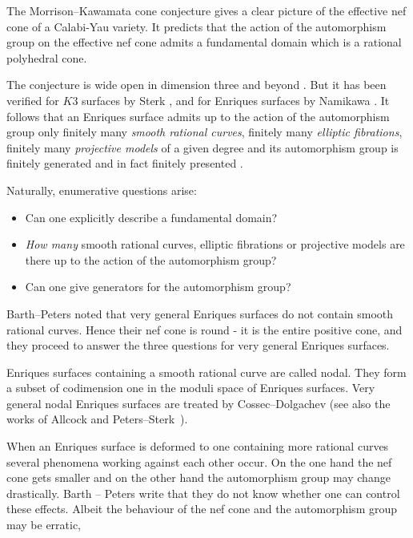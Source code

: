 \documentclass{amsart}
\numberwithin{procedure}{section}
\begin{document}
The Morrison--Kawamata cone conjecture \cite{morrison1992,kawamata1997} gives a clear picture of the effective nef cone of a Calabi-Yau variety.
It predicts that the action of the automorphism group on the effective nef cone admits a fundamental domain which is a rational polyhedral cone.
\par
The conjecture is wide open in dimension three and beyond \cite{lazicoguiso2018}. 
But it has been verified for $K3$ surfaces by Sterk \cite{sterk1985},
and for Enriques surfaces by Namikawa \cite{namikawa1985}.
It follows that an Enriques surface admits up to the action of the automorphism group only finitely many \emph{smooth rational curves}, 
finitely many \emph{elliptic fibrations}, finitely many \emph{projective models} of a given degree and
its automorphism group is finitely generated and in fact finitely presented \cite[Corollaries 4.15, 4.16]{looijenga2014}.
\par
Naturally, enumerative questions arise:
\begin{itemize}
 \item Can one explicitly describe a fundamental domain?
 \item \emph{How many} smooth rational curves, elliptic fibrations or projective models are there up to the action of the automorphism group?
 \item Can one give generators for the automorphism group?
\end{itemize}
Barth--Peters \cite{BP1983} noted that very general Enriques surfaces do not contain smooth rational curves. 
Hence their nef cone is round - it is the entire positive cone, and they proceed to answer the three questions for very general Enriques surfaces.
\par
Enriques surfaces containing a smooth rational curve are called nodal. 
They form a subset of codimension one in the moduli space of Enriques surfaces. Very general nodal Enriques surfaces are treated by Cossec--Dolgachev \cite{CossecDolgachev1985}
 (see also the works of Allcock \cite{Allcock2018} and Peters--Sterk~\cite{PetersSterk2020}).
\par
 When an Enriques surface is deformed to one containing more rational curves several phenomena working against each other occur. 
 On the one hand the nef cone gets smaller and on the other hand the automorphism group may change drastically.
 Barth -- Peters \cite[p.395]{BP1983} write that they do not know whether one can control these effects.
 Albeit the behaviour of the nef cone and the automorphism group may be erratic, 
\end{document}
